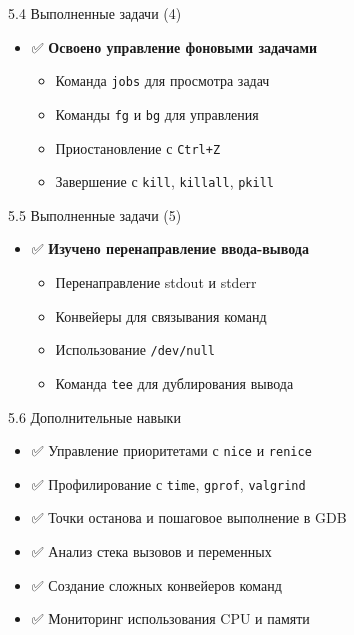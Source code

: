 \documentclass[
  ignorenonframetext,
  aspectratio=169,
  russian,
]{beamer}
\providecommand{\tightlist}{%
  \setlength{\itemsep}{0pt}\setlength{\parskip}{0pt}}
\begin{document}
\begin{frame}[fragile]{5.4 Выполненные задачи (4)}
\label{ux432ux44bux43fux43eux43bux43dux435ux43dux43dux44bux435-ux437ux430ux434ux430ux447ux438-4}
\begin{itemize}[<+->]
\tightlist
\item
  ✅ \textbf{Освоено управление фоновыми задачами}

  \begin{itemize}[<+->]
  \tightlist
  \item
    Команда \texttt{jobs} для просмотра задач
  \item
    Команды \texttt{fg} и \texttt{bg} для управления
  \item
    Приостановление с \texttt{Ctrl+Z}
  \item
    Завершение с \texttt{kill}, \texttt{killall}, \texttt{pkill}
  \end{itemize}
\end{itemize}
\end{frame}

\begin{frame}[fragile]{5.5 Выполненные задачи (5)}
\label{ux432ux44bux43fux43eux43bux43dux435ux43dux43dux44bux435-ux437ux430ux434ux430ux447ux438-5}
\begin{itemize}[<+->]
\tightlist
\item
  ✅ \textbf{Изучено перенаправление ввода-вывода}

  \begin{itemize}[<+->]
  \tightlist
  \item
    Перенаправление stdout и stderr
  \item
    Конвейеры для связывания команд
  \item
    Использование \texttt{/dev/null}
  \item
    Команда \texttt{tee} для дублирования вывода
  \end{itemize}
\end{itemize}
\end{frame}

\begin{frame}[fragile]{5.6 Дополнительные навыки}
\label{ux434ux43eux43fux43eux43bux43dux438ux442ux435ux43bux44cux43dux44bux435-ux43dux430ux432ux44bux43aux438}
\begin{itemize}[<+->]
\tightlist
\item
  ✅ Управление приоритетами с \texttt{nice} и \texttt{renice}
\item
  ✅ Профилирование с \texttt{time}, \texttt{gprof}, \texttt{valgrind}
\item
  ✅ Точки останова и пошаговое выполнение в GDB
\item
  ✅ Анализ стека вызовов и переменных
\item
  ✅ Создание сложных конвейеров команд
\item
  ✅ Мониторинг использования CPU и памяти
\end{itemize}
\end{frame}
\end{document}
